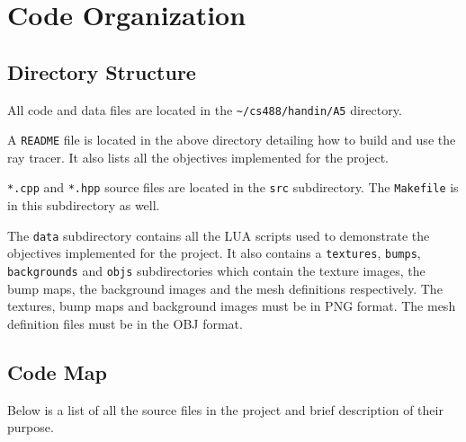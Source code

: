 \chapter{Code Organization}

\section{Directory Structure}
All code and data files are located in the \verb|~/cs488/handin/A5| directory.

A \verb|README| file is located in the above directory detailing how to build
and use the ray tracer. It also lists all the objectives implemented for the
project.

\verb|*.cpp| and \verb|*.hpp| source files are located in the \verb|src| 
subdirectory. The \verb|Makefile| is in this subdirectory as well.

The \verb|data| subdirectory contains all the LUA scripts used to demonstrate
the objectives implemented for the project. It also contains a \verb|textures|,
\verb|bumps|, \verb|backgrounds| and \verb|objs| subdirectories which contain
the texture images, the bump maps, the background images and the mesh
definitions respectively. The textures, bump maps and background images must be
in PNG format. The mesh definition files must be in the OBJ format.

\section{Code Map}
Below is a list of all the source files in the project and brief description of
their purpose.



